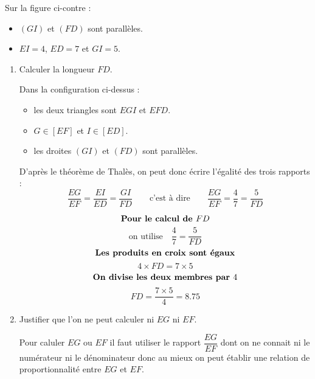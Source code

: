 \begin{corrige}
    \phantom{rrr}

    \begin{minipage}{0.6\linewidth}
        Sur la figure ci-contre :
        \begin{itemize}
            \item $(GI)$ et $(FD)$ sont parallèles.
            \item $EI=4$, $ED=7$ et $GI=5$.
        \end{itemize}
    \end{minipage}
    \begin{minipage}{0.3\linewidth}   
    \end{minipage}
        \begin{enumerate}
            \item Calculer la longueur $FD$.
            
            {\color{red}
            Dans la configuration ci-dessus : 
            \begin{itemize}
                \item les deux triangles sont $EGI$ et $EFD$.
                \item $G \in [EF]$ et $I \in [ED]$.
                \item les droites $(GI)$ et $(FD)$ sont parallèles.                
            \end{itemize}
            D'après le théorème de Thalès, on peut donc écrire l'égalité des trois rapports :
            $$\frac{EG}{EF}=\frac{EI}{ED}=\frac{GI}{FD}\qquad\mbox{c'est à dire}\qquad\frac{EG}{EF}=\frac{4}{7}=\frac{5}{FD}$$
            
                $$\mbox{\bf Pour le calcul de $FD$}$$
                $$\mbox{on utilise} \quad \dfrac{4}{7}=\dfrac{5}{FD}$$
                $$\mbox{\bf Les produits en croix sont égaux}$$
                $$4\times FD=7\times5$$
                $$\mbox{\bf On divise les deux membres par $4$}$$                
                $$FD=\frac{7\times5}{4}=\num{8.75}$$            
            }
            \item Justifier que l'on ne peut calculer ni $EG$ ni $EF$.
            
            {\color{red} Pour caluler $EG$ ou $EF$ il faut utiliser le rapport $\dfrac{EG}{EF}$ dont on ne connait ni le 
            numérateur ni le dénominateur donc au mieux on peut établir une relation de proportionnalité entre $EG$ et $EF$.}
        \end{enumerate}


\end{corrige}

